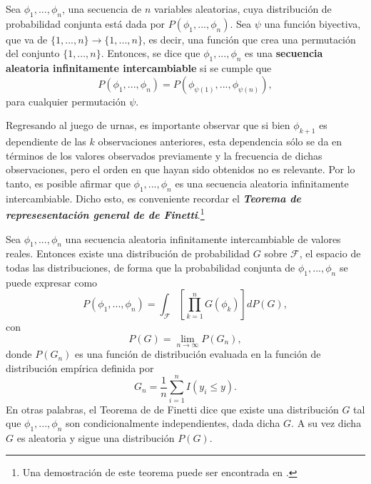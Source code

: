 \begin{defin*}
    Sea $\phi_1,...,\phi_n$, una secuencia de $n$ variables aleatorias, cuya distribuci\'on de probabilidad conjunta est\'a dada por $P(\phi_1,...,\phi_n)$. Sea $\psi$ una funci\'on biyectiva, que va de $\{1,...,n\} \rightarrow \{1,...,n\}$, es decir, una funci\'on que crea una permutaci\'on del conjunto $\{1,...,n\}$.  
    Entonces, se dice que $\phi_1,...,\phi_n$ es una \textbf{secuencia aleatoria infinitamente intercambiable} si se cumple que 
    \begin{equation*}
        P(\phi_1,...,\phi_n) = P(\phi_{\psi(1)},...,\phi_{\psi(n)}),
    \end{equation*}
    para cualquier permutaci\'on $\psi$.
\end{defin*}

Regresando al juego de urnas, es importante observar que si bien $\phi_{k+1}$ es dependiente de las $k$ observaciones anteriores, esta dependencia s\'olo se da en t\'erminos de los valores observados previamente y la frecuencia de dichas observaciones, pero el orden en que hayan sido obtenidos no es relevante. Por lo tanto, es posible afirmar que $\phi_1,...,\phi_n$ es una secuencia aleatoria infinitamente intercambiable. Dicho esto, es conveniente recordar el \textbf{\textit{Teorema de represesentaci\'on general de de Finetti}}.\footnote{Una demostraci\'on de este teorema puede ser encontrada en \cite{Schervish_TheoryStats}.}

\begin{theorem*}
    Sea $\phi_1, ...,\phi_n$ una secuencia aleatoria infinitamente intercambiable de valores reales. Entonces existe una distribuci\'on de probabilidad $G$ sobre $\mathcal{F}$, el espacio de todas las distribuciones, de forma que la probabilidad conjunta de $\phi_1, ...,\phi_n$ se puede expresar como
    \begin{equation*}
        P(\phi_1, ...,\phi_n) =
        \int_{\mathcal{F}}\left[\prod_{k=1}^n G(\phi_k)\right]dP(G),
    \end{equation*}
    con
    \begin{equation*}
        P(G) = \lim_{n \to \infty} P(G_n),
    \end{equation*}
    donde $P(G_n)$ es una funci\'on de distribuci\'on evaluada en la funci\'on de distribuci\'on emp\'irica definida por
    \begin{equation*}
        G_n = \frac{1}{n} \sum_{i=1}^n I(y_i \leq y).
    \end{equation*}
    En otras palabras, el Teorema de de Finetti dice que existe una distribuci\'on $G$ tal que $\phi_1, ...,\phi_n$ son condicionalmente independientes, dada dicha $G$. A su vez dicha $G$ es aleatoria y sigue una distribuci\'on $P(G)$.
\end{theorem*}

